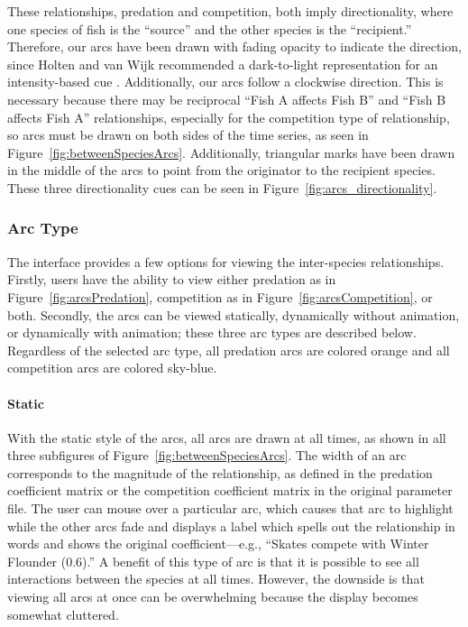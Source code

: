 These relationships, predation and competition, both imply directionality, where one species of fish is the ``source'' and the other species is the ``recipient.''  Therefore, our arcs have been drawn with fading opacity to indicate the direction, since Holten and van Wijk recommended a dark-to-light representation for an intensity-based cue \cite{holten2009}.  Additionally, our arcs follow a clockwise direction.  This is necessary because there may be reciprocal ``Fish A affects Fish B'' and ``Fish B affects Fish A'' relationships, especially for the competition type of relationship, so arcs must be drawn on both sides of the time series, as seen in Figure~\ref{fig:betweenSpeciesArcs}.  Additionally, triangular marks have been drawn in the middle of the arcs to point from the originator to the recipient species.  These three directionality cues can be seen in Figure~\ref{fig:arcs_directionality}.

\subsubsection{Arc Type}

The interface provides a few options for viewing the inter-species relationships.  Firstly, users have the ability to view either predation as in Figure~\ref{fig:arcsPredation}, competition as in Figure~\ref{fig:arcsCompetition}, or both.  Secondly, the arcs can be viewed statically, dynamically without animation, or dynamically with animation; these three arc types are described below.  Regardless of the selected arc type, all predation arcs are colored orange and all competition arcs are colored sky-blue.

\paragraph{Static}

With the static style of the arcs, all arcs are drawn at all times, as shown in all three subfigures of Figure~\ref{fig:betweenSpeciesArcs}.  The width of an arc corresponds to the magnitude of the relationship, as defined in the predation coefficient matrix or the competition coefficient matrix in the original parameter file.  The user can mouse over a particular arc, which causes that arc to highlight while the other arcs fade and displays a label which spells out the relationship in words and shows the original coefficient---e.g., ``Skates compete with Winter Flounder (0.6).''  A benefit of this type of arc is that it is possible to see all interactions between the species at all times.  However, the downside is that viewing all arcs at once can be overwhelming because the display becomes somewhat cluttered.

